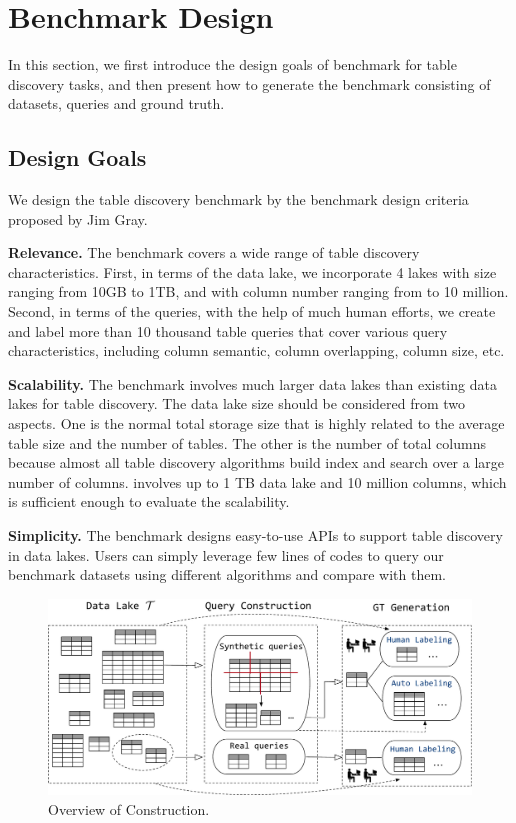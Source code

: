 \section{Benchmark Design} 
In this section, we first introduce the design goals of \sys benchmark for table discovery tasks, and then present how to generate the \sys benchmark consisting of datasets, queries and ground truth.

\subsection{Design Goals}
We design the table discovery benchmark by the 
benchmark design criteria proposed by Jim Gray.

\noindent\textbf{Relevance.}
The benchmark covers a wide range of table discovery characteristics. First, in terms of the data lake, we incorporate 4 lakes with size ranging from 10GB to 1TB, and with column number ranging from  to 10 million. Second, in terms of the queries, with the help of much human efforts, we create and label more than 10 thousand table queries that cover various query characteristics, including column semantic, column overlapping, column size, etc.



\noindent\textbf{Scalability.} The benchmark involves much larger data lakes than existing data lakes for table discovery. The data lake size should be considered from two aspects. One is the normal total storage size that is highly related  to the average table size  and the number of tables. The other is the number of total columns because almost all table discovery algorithms build index and search over a large number of columns.  \sys involves up to 1 TB data lake and 10 million columns, which is sufficient enough to evaluate the scalability.




\noindent\textbf{Simplicity.} The benchmark designs easy-to-use APIs to support table discovery in data lakes. Users can simply leverage few lines of codes to query our benchmark datasets using different algorithms and compare with them.





\begin{figure}[h]
	\centering
	\includegraphics[width=1\linewidth]{fig/benchmark.pdf}
	\caption{Overview of \sys Construction.}
	\label{fig:benchmark}
\end{figure}




